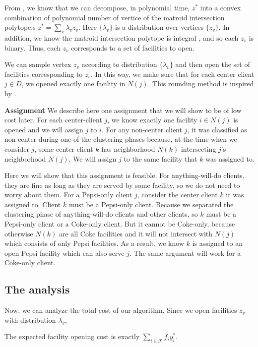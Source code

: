 From \cite{grotschel1981ellipsoid}, we know that we can decompose,
in polynomial time, $z^*$ into a convex combination of polynomial number of vertice of
the matroid intersection polytope:s
$z^* = \sum_{v} \lambda_v z_v$.
Here $\{\lambda_v\}$ is a distribution over vertices $\{z_v\}$.
In addition, we know the matroid intersection polytope is integral \cite{schrijver2003combinatorial}, and
so each $z_v$ is binary. Thus, each $z_v$ corresponds to a set of facilities to open.

We can sample vertex $z_v$ according to distribution $\{\lambda_v\}$
and then open the set of facilities corresponding to $z_v$.
In this way, we make sure that for each center client $j \in D$, we opened exactly one facility in $N(j)$.
This rounding method is inspired by \cite{swamy2013improved}.

\textbf{Assignment} We describe here one assignment that we will show to be of low cost later.
For each center-client $j$, we know exactly one facility $i \in N(j)$
is opened and we will assign $j$ to $i$.
For any non-center client $j$, it was classified as non-center during one of the clustering phases
because, at the time when we consider $j$, some center client $k$ has neighborhood $N(k)$
intersecting $j$'s neighborhood $N(j)$. We will assign $j$ to the same facility that $k$ was assigned to.

Here we will show that this assignment is feasible.
For anything-will-do clients, they are fine as long as they are served by some facility, so we do not need to worry about them.
For a Pepsi-only client $j$, consider the center client $k$ it was assigned to.
Client $k$ must be a Pepsi-only client. Because we separated the clustering phase of anything-will-do clients
and other clients, so $k$ must be a Pepsi-only client or a Coke-only client.
But it cannot be Coke-only, because otherwise $N(k)$ are all Coke facilities and it will not intersect with
$N(j)$ which consists of only Pepsi facilities.
As a result, we know $k$ is assigned to an open Pepsi facility which can also serve $j$.
The same argument will work for a Coke-only client.


\subsection{The analysis}

Now, we can analyze the total cost of our algorithm. Since we open facilities $z_v$ with distribution $\lambda_v$, 

\begin{lem}
The expected facility opening cost is exactly %
$\sum_{i \in \mathcal{F}} f_i y^*_i$.
\end{lem}

